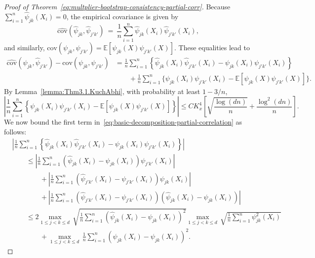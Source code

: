 \documentclass[11pt]{article}
\begin{document}
\begin{appendices}
\begin{proof}[Proof of Theorem~\ref{eq:multplier-bootstrap-consistency-partial-corr}]
Because $\sum_{i=1}^n \widehat{\psi}_{jk}(X_i) = 0$, the empirical covariance is given by
\[
\widehat{\mbox{cov}}(\widehat{\psi}_{jk}, \widehat{\psi}_{j'k'}) ~=~ \frac{1}{n}\sum_{i=1}^n \widehat{\psi}_{jk}(X_i)\widehat{\psi}_{j'k'}(X_i),
\]
and similarly, $\mbox{cov}(\psi_{jk}, \psi_{j'k'}) = \mathbb{E}[\psi_{jk}(X)\psi_{j'k'}(X)]$. These equalities lead to
\begin{equation}\label{eq:basic-decomposition-partial-correlation}
\begin{split}
\widehat{\mbox{cov}}(\widehat{\psi}_{jk}, \widehat{\psi}_{j'k'}) - \mbox{cov}(\psi_{jk}, \psi_{j'k'}) &= \frac{1}{n}\sum_{i=1}^n \left\{\widehat{\psi}_{jk}(X_i)\widehat{\psi}_{j'k'}(X_i) - \psi_{jk}(X_i)\psi_{j'k'}(X_i)\right\}\\
&\qquad+ \frac{1}{n}\sum_{i=1}^n \Big\{\psi_{jk}(X_i)\psi_{j'k'}(X_i) - \mathbb{E}\left[\psi_{jk}(X)\psi_{j'k'}(X)\right]\Big\}.
\end{split}
\end{equation}
By Lemma~\ref{lemma:Thm3.1.KuchAbhi}, with probability at least $1 - 3/n$,
\[
\left|\frac{1}{n}\sum_{i=1}^n \left\{\psi_{jk}(X_i)\psi_{j'k'}(X_i) - \mathbb{E}\left[\psi_{jk}(X)\psi_{j'k'}(X)\right]\right\}\right| \le CK_x^4\left[\sqrt{\frac{\log(dn)}{n}} + \frac{\log^{2}(dn)}{n}\right].
\]
We now bound the first term in~\eqref{eq:basic-decomposition-partial-correlation} as follows:
\begin{align*}
&\left|\frac{1}{n}\sum_{i=1}^n \left\{\widehat{\psi}_{jk}(X_i)\widehat{\psi}_{j'k'}(X_i) - \psi_{jk}(X_i)\psi_{j'k'}(X_i)\right\}\right|\\ 
&\qquad\le \left|\frac{1}{n}\sum_{i=1}^n \left(\widehat{\psi}_{jk}(X_i) - \psi_{jk}(X_i)\right)\psi_{j'k'}(X_i)\right|\\
&\qquad\qquad+ \left|\frac{1}{n}\sum_{i=1}^n \left(\widehat{\psi}_{j'k'}(X_i) - \psi_{j'k'}(X_i)\right)\psi_{jk}(X_i)\right|\\
&\qquad\qquad+ \left|\frac{1}{n}\sum_{i=1}^n \left(\widehat{\psi}_{j'k'}(X_i) - \psi_{j'k'}(X_i)\right)\left(\widehat{\psi}_{jk}(X_i) - \psi_{jk}(X_i)\right)\right|\\
&\qquad\le 2\max_{1\le j < k\le d}\,\sqrt{\frac{1}{n}\sum_{i=1}^n \left(\widehat{\psi}_{jk}(X_i) - \psi_{jk}(X_i)\right)^2}\max_{1\le j < k\le d}\,\sqrt{\frac{1}{n}\sum_{i=1}^n \psi_{jk}^2(X_i)}\\
&\qquad\qquad+ \max_{1\le j < k\le d}\,{\frac{1}{n}\sum_{i=1}^n \left(\widehat{\psi}_{jk}(X_i) - \psi_{jk}(X_i)\right)^2}.
\end{align*}


\end{proof}
\end{appendices}
\end{document}
